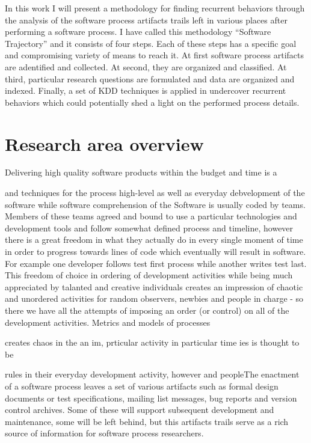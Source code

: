 In this work I will present a methodology for finding recurrent behaviors through the analysis of the software process artifacts trails left in various places after performing a software process. I have called this methodology ``Software Trajectory'' and it consists of four steps. Each of these steps has a specific goal and compromising variety of means to reach it. At first software process artifacts are adentified and collected. At second, they are organized and classified. At third, particular research questions are formulated and data are organized and indexed. Finally, a set of KDD techniques is applied in undercover recurrent behaviors which could potentially shed a light on the performed process details. 

\section{Research area overview}
Delivering high quality software products within the budget and time is a 



and techniques for the process high-level as well as everyday debvelopment of the software while software comprehension of the Software is usually coded by teams. Members of these teams agreed and bound to use a particular technologies and development tools and follow somewhat defined process and timeline, however there is a great freedom in what they actually do in every single moment of time in order to progress towards lines of code which eventually will result in software. For example one developer follows test first process while another writes test last. This freedom of choice in ordering of development activities while being much appreciated by talanted and creative individuals creates an impression of chaotic and unordered activities for random observers, newbies and people in charge - so there we have all the attempts of imposing an order (or control) on all of the development activities. Metrics and models of processes 

 creates chaos in the an im, prticular activity in particular time ies is thought to be 


 rules in their everyday development activity, however  and peopleThe enactment of a software process leaves a set of various artifacts such as formal design documents or test specifications, mailing list messages, bug reports and version control archives. Some of these will support subsequent development and maintenance, some will be left behind, but this artifacts trails serve as a rich source of information for software process researchers. 
